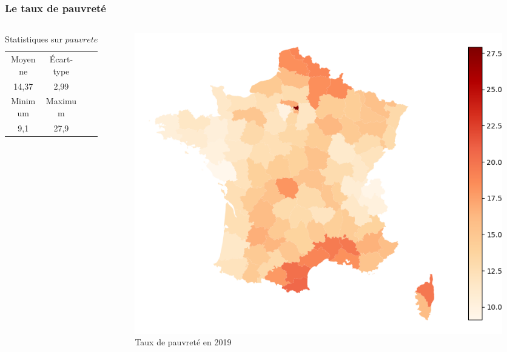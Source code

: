 \documentclass{beamer}
\begin{document}
\begin{frame}
    \frametitle{Le taux de pauvreté}
    \begin{columns}
    
    \begin{column}{0.5\textwidth}
    \begin{table}[H]
        \caption*{Statistiques sur $pauvrete$}
        \begin{tabular}{cccc}
        \toprule
        Moyenne  & Écart-type   \\ 
        14,37 & 2,99   \\
        \midrule
        Minimum & Maximum   \\ 
        9,1    & 27,9      \\
        \bottomrule
        \end{tabular}
    \end{table}
    \end{column}

    \begin{column}{0.5\textwidth}
        \centering
        \begin{figure}
            \includegraphics[width=\textwidth]{pauvrete.png}
            \caption{Taux de pauvreté en 2019}
        \end{figure}
    \end{column}
    
    \end{columns}
\end{frame}
\end{document}
